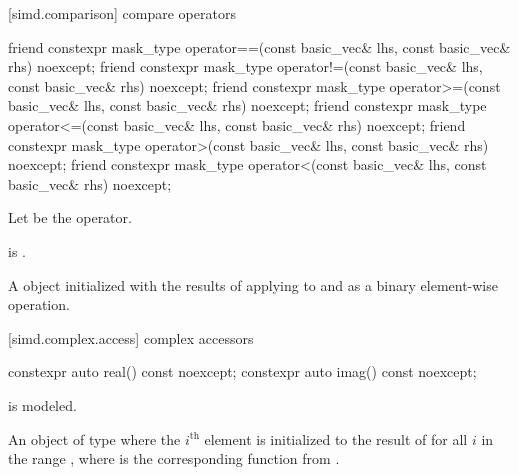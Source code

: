 [simd.comparison]{ compare operators}

\begin{itemdecl}
friend constexpr mask_type operator==(const basic_vec& lhs, const basic_vec& rhs) noexcept;
friend constexpr mask_type operator!=(const basic_vec& lhs, const basic_vec& rhs) noexcept;
friend constexpr mask_type operator>=(const basic_vec& lhs, const basic_vec& rhs) noexcept;
friend constexpr mask_type operator<=(const basic_vec& lhs, const basic_vec& rhs) noexcept;
friend constexpr mask_type operator>(const basic_vec& lhs, const basic_vec& rhs) noexcept;
friend constexpr mask_type operator<(const basic_vec& lhs, const basic_vec& rhs) noexcept;
\end{itemdecl}

\begin{itemdescr}
\pnum
Let  be the operator.

\pnum
\constraints
{} is
.

\pnum
\returns
A  object initialized with the results of applying
 to  and  as a binary element-wise
operation.
\end{itemdescr}

[simd.complex.access]{ complex accessors}

\begin{itemdecl}
constexpr auto real() const noexcept;
constexpr auto imag() const noexcept;
\end{itemdecl}

\begin{itemdescr}
\pnum
\constraints
{} is modeled.

\pnum
\returns
An object of type 
where the $i^\text{th}$ element is initialized to the result of
 for all $i$ in the range
, where  is the corresponding function
from .
\end{itemdescr}

